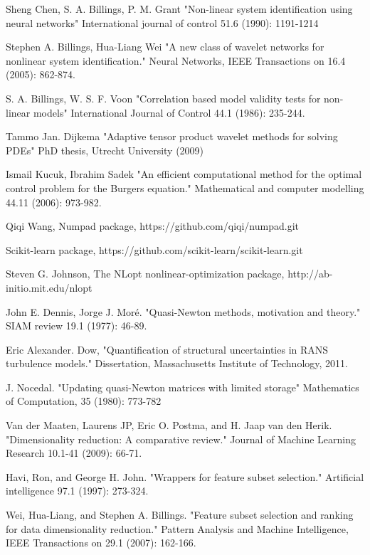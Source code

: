 \documentclass[a4paper,onecolumn]{article}
\theoremstyle{remark}
\begin{document}
\begin{thebibliography}{9}
Sheng Chen, S. A. Billings, P. M. Grant
"Non-linear system identification using neural networks" 
International journal of control 51.6 (1990): 1191-1214

Stephen A. Billings, Hua-Liang Wei
"A new class of wavelet networks for nonlinear system identification."
Neural Networks, IEEE Transactions on 16.4 (2005): 862-874.

S. A. Billings, W. S. F. Voon
"Correlation based model validity tests for non-linear models"
International Journal of Control 44.1 (1986): 235-244.

Tammo Jan. Dijkema
"Adaptive tensor product wavelet methods for solving PDEs"
PhD thesis, Utrecht University (2009)

Ismail Kucuk,  Ibrahim Sadek
"An efficient computational method for the optimal control problem for the Burgers equation." 
Mathematical and computer modelling 44.11 (2006): 973-982.

Qiqi Wang,
Numpad package,
https://github.com/qiqi/numpad.git

Scikit-learn package,
https://github.com/scikit-learn/scikit-learn.git

Steven G. Johnson,
The NLopt nonlinear-optimization package, 
http://ab-initio.mit.edu/nlopt

John E. Dennis, Jorge J. Moré.
"Quasi-Newton methods, motivation and theory." SIAM review 19.1 (1977): 46-89.

Eric Alexander. Dow,
"Quantification of structural uncertainties in RANS turbulence models."
Dissertation, Massachusetts Institute of Technology, 2011.

J. Nocedal.
"Updating quasi-Newton matrices with limited storage"
Mathematics of Computation, 35 (1980): 773-782

Van der Maaten, Laurens JP, Eric O. Postma, and H. Jaap van den Herik. 
"Dimensionality reduction: A comparative review." 
Journal of Machine Learning Research 10.1-41 (2009): 66-71.

Havi, Ron, and George H. John. 
"Wrappers for feature subset selection."
Artificial intelligence 97.1 (1997): 273-324.

Wei, Hua-Liang, and Stephen A. Billings. 
"Feature subset selection and ranking for data dimensionality reduction." 
Pattern Analysis and Machine Intelligence, IEEE Transactions on 29.1 (2007): 162-166.


\end{thebibliography}
\end{document}
